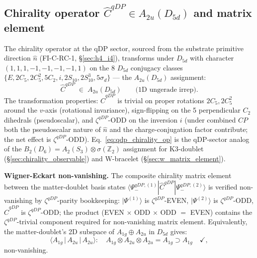 \documentclass[11pt,letterpaper]{article}
\newcommand{\Dsix}{D_6}
\newcommand{\Sthree}{S_3}
\begin{document}
\subsection{Chirality operator $\hat{C}^{qDP} \in A_{2u}(D_{5d})$ and matrix element}\label{sec:qdp_matrix_element}

The chirality operator at the qDP sector, sourced from the substrate primitive direction $\hat{n}$ (FI-C-RC-1, \S\ref{sec:h4_i4}), transforms under $D_{5d}$ with character $(1, 1, 1, -1, -1, -1, -1, 1)$ on the 8 $D_{5d}$ conjugacy classes $\{E, 2C_5, 2C_5^2, 5C_2, i, 2S_{10}, 2S_{10}^3, 5\sigma_d\}$ --- the $A_{2u}(D_{5d})$ assignment:
\begin{equation}\label{eq:qdp_chirality_op}
\hat{C}^{qDP} \;\in\; A_{2u}(D_{5d}) \qquad \text{(1D ungerade irrep)}.
\end{equation}
The transformation properties: $\hat{C}^{qDP}$ is trivial on proper rotations $2C_5, 2C_5^2$ around the $v$-axis (rotational invariance), sign-flipping on the 5 perpendicular $C_2$ dihedrals (pseudoscalar), and $\zeta^{qDP}$-ODD on the inversion $i$ (under combined $CP$ both the pseudoscalar nature of $\hat{n}$ and the charge-conjugation factor contribute; the net effect is $\zeta^{qDP}$-ODD). Eq.~\eqref{eq:qdp_chirality_op} is the qDP-sector analog of the $B_2(\Dsix) = A_2(\Sthree) \otimes \sigma(\mathbb{Z}_2)$ assignment for K3-doublet (\S\ref{sec:chirality_observable}) and W-bracelet (\S\ref{sec:w_matrix_element}).

\textbf{Wigner-Eckart non-vanishing.} The composite chirality matrix element between the matter-doublet basis states $\langle \Psi_-^{qDP,(1)} | \hat{C}^{qDP} | \Psi_-^{qDP,(2)} \rangle$ is verified non-vanishing by $\zeta^{qDP}$-parity bookkeeping: $|\Psi^{(1)}\rangle$ is $\zeta^{qDP}$-EVEN, $|\Psi^{(2)}\rangle$ is $\zeta^{qDP}$-ODD, $\hat{C}^{qDP}$ is $\zeta^{qDP}$-ODD; the product (EVEN $\times$ ODD $\times$ ODD $=$ EVEN) contains the $\zeta^{qDP}$-trivial component required for non-vanishing matrix element. Equivalently, the matter-doublet's 2D subspace of $A_{1g} \oplus A_{2u}$ in $D_{5d}$ gives:
\[
\langle A_{1g} \,|\, A_{2u} \,|\, A_{2u} \rangle: \quad A_{1g} \otimes A_{2u} \otimes A_{2u} = A_{1g} \supset A_{1g} \quad \checkmark,
\]
non-vanishing.
\end{document}
